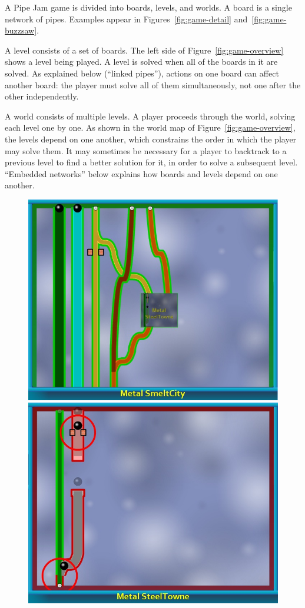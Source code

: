 \documentclass{sig-alternate}
\newcommand{\figref}[1]{Figure~\ref{#1}}
\let\Description =\description
\def\Nospacing{\itemsep=0pt\topsep=0pt\partopsep=0pt\parskip=0pt\parsep=0pt}
\renewenvironment{description}{\Description\Nospacing}{\endlist}
\begin{document}
\begin{description}

\item[Boards]
  A Pipe Jam game is divided into boards, levels, and worlds.  A board is a
  single network of pipes.  Examples appear in
  Figures~\ref{fig:game-detail} and~\ref{fig:game-buzzsaw}.

\item[Levels]
  A level consists of a set of boards.  The left side of
  Figure~\ref{fig:game-overview} shows a level being played.  A level
  is solved when all of the boards in it are solved.  As explained
  below (``linked pipes''), actions on one board can affect another board:
  the player must solve all of them simultaneously, not one after the other
  independently.

\item[Worlds]
  A world consists of multiple levels.  A player proceeds through the
  world, solving each level one by one.  As shown in the world map
  of \figref{fig:game-overview}, the levels depend on one another,
  which constrains the order in which the player may solve them.  It may
  sometimes be necessary for a player to backtrack to a previous level to
  find a better solution for it, in order to solve a subsequent level.
  ``Embedded networks'' below explains how boards and levels depend on one
  another.

\begin{figure}
\begin{center}
\includegraphics[width=.49\textwidth]{images/world1-subnetwork}%
\hfill%
\includegraphics[width=.49\textwidth]{images/world1-merge-and-pinch}
\end{center}
\vspace{10pt}


\end{figure}
\end{description}
\end{document}
